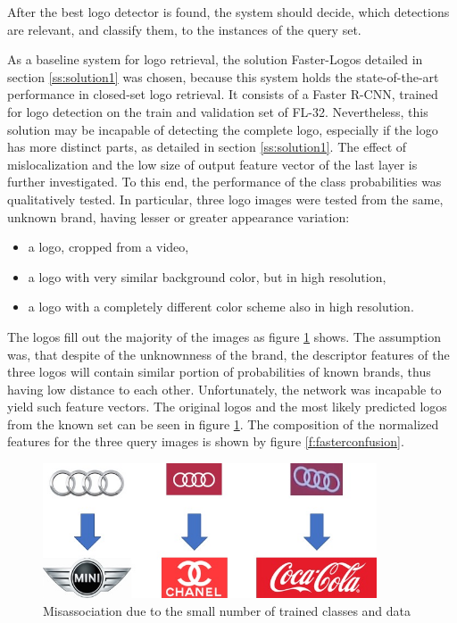 After the best logo detector is found, the system should decide, which detections are relevant, and classify them, to the instances of the query set.

As a baseline system for logo retrieval, the solution Faster-Logos detailed in section \ref{ss:solution1} was chosen, because this system holds the state-of-the-art performance in closed-set logo retrieval. It consists of a Faster R-CNN, trained for logo detection on the train and validation set of FL-32.
\bigbreak
Nevertheless, this solution may be incapable of detecting the complete logo, especially if the logo has more distinct parts, as detailed in section \ref{ss:solution1}. The effect of mislocalization and the low size of output feature vector of the last layer is further investigated. To this end, the performance of the class probabilities was qualitatively tested. In particular, three logo images were tested from the same, unknown brand, having lesser or greater appearance variation:
\begin{itemize}
	\item a logo, cropped from a video,
	\item a logo with very similar background color, but in high resolution,
	\item a logo with a completely different color scheme also in high resolution.
\end{itemize}

The logos fill out the majority of the images as figure \ref{f:confusion} shows. The assumption was, that despite of the unknownness of the brand, the descriptor features of the three logos will contain similar portion of probabilities of known brands, thus having low distance to each other. Unfortunately, the network was incapable to yield such feature vectors. The original logos and the most likely predicted logos from the known set can be seen in figure \ref{f:confusion}. The composition of the normalized features for the three query images is shown by figure \ref{f:fasterconfusion}.

\begin{figure}
  \centering
  \includegraphics[height=40mm]{images/mt/confusion.jpg}
  \caption{Misassociation due to the small number of trained classes and data}
  \label{f:confusion}
\end{figure}

